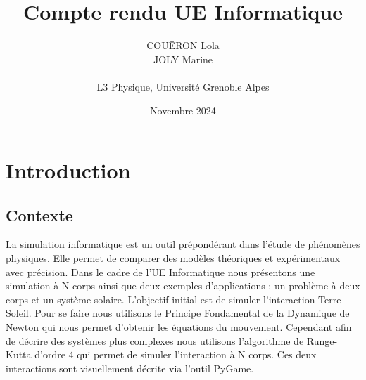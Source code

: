 \documentclass[a4paper, 12pt]{article}
\begin{document}
 
\title{\textbf{Compte rendu UE Informatique}}
\author{COUËRON Lola \\ JOLY Marine \\ \\ L3 Physique, Université Grenoble Alpes}
\date{Novembre 2024}

\maketitle 


{
\hypersetup{hidelinks}

\renewcommand{\contentsname}{Sommaire}
\tableofcontents
}
%
%
%
\newpage
\section{Introduction}

\subsection{Contexte}	
	La simulation informatique est un outil prépondérant dans l’étude de phénomènes physiques. Elle permet de comparer des modèles théoriques et expérimentaux avec précision. Dans le cadre de l’UE Informatique nous présentons une simulation à N corps ainsi que deux exemples d'applications : un problème à deux corps et un système solaire.
L'objectif initial est de simuler l’interaction Terre - Soleil. Pour se faire nous utilisons le Principe Fondamental de la Dynamique de Newton qui nous permet d’obtenir les équations du mouvement. Cependant afin de décrire des systèmes plus complexes nous utilisons l’algorithme de Runge-Kutta d’ordre 4 qui permet de simuler l'interaction à N corps. Ces deux interactions sont visuellement décrite via l'outil PyGame.
\end{document}

